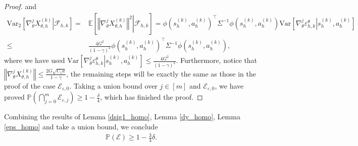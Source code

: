 \documentclass{article}
\numberwithin{equation}{section}
\begin{document}
\begin{proof}
and
\begin{align*} 
    \textrm{Var}_2\left[\left.\nabla_\theta^j X_{\theta,h}^{(k)}\right\vert\mathcal{F}_{h,k}\right]=&\mathbb{E}\left[\left.\left\Vert\nabla_\theta^j X_{\theta,h}^{(k)}\right\Vert^2\right\vert\mathcal{F}_{h,k}\right]=\phi\left(s_h^{(k)},a_h^{(k)}\right)^\top\Sigma^{-1}\phi\left(s_h^{(k)},a_h^{(k)}\right)\textrm{Var}\left[\left.\nabla_\theta^j\varepsilon_{h,k}^\theta\right\vert s_h^{(k)},a_h^{(k)}\right]\\
    \leq&\frac{4G^2}{(1-\gamma)^2}\phi\left(s_h^{(k)},a_h^{(k)}\right)^\top\Sigma^{-1}\phi\left(s_h^{(k)},a_h^{(k)}\right),  
\end{align*}
where we have used $\textrm{Var}\left[\left.\nabla_\theta^j\varepsilon_{h,k}^\theta\right\vert s_h^{(k)},a_h^{(k)}\right]\leq \frac{4G^2}{(1-\gamma)^2}$. Furthermore, notice that $\left\Vert\nabla_\theta^j X_{\theta,h}^{(k)}\right\Vert\leq\frac{2G\sqrt{C_1d}}{1-\gamma}$, the remaining steps will be exactly the same as those in the proof of the case $\mathcal{E}_{\varepsilon,0}$. Taking a union bound over $j\in[m]$ and $\mathcal{E}_{\varepsilon,0}$, we have proved $\mathbb{P}\left(\bigcap_{j=0}^m\mathcal{E}_{\varepsilon, j}\right)\geq 1-\frac{\delta}{4}$, which has finished the proof. 
\end{proof}
Combining the results of Lemma \ref{dsig1_homo}, Lemma \ref{dy_homo}, Lemma \ref{eps_homo} and take a union bound, we conclude 
\begin{align*}
\mathbb{P}\left(\mathcal{E}\right) \geq 1-\frac{3}{4}\delta. 
\end{align*}
\end{document}
